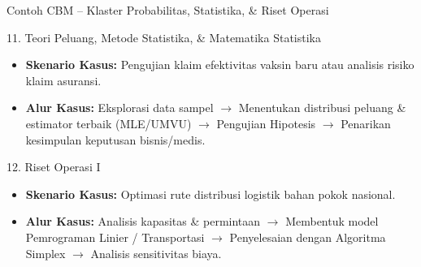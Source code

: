 \documentclass[aspectratio=169]{beamer} %
\begin{document}
\begin{frame}{Contoh CBM – Klaster Probabilitas, Statistika, \& Riset Operasi}
    \begin{block}{11. Teori Peluang, Metode Statistika, \& Matematika Statistika}
        \begin{itemize}
            \item \textbf{Skenario Kasus:} Pengujian klaim efektivitas vaksin baru atau analisis risiko klaim asuransi.
            \item \textbf{Alur Kasus:} Eksplorasi data sampel $\rightarrow$ Menentukan distribusi peluang \& estimator terbaik (MLE/UMVU) $\rightarrow$ Pengujian Hipotesis $\rightarrow$ Penarikan kesimpulan keputusan bisnis/medis.
        \end{itemize}
    \end{block}

    \begin{block}{12. Riset Operasi I}
        \begin{itemize}
            \item \textbf{Skenario Kasus:} Optimasi rute distribusi logistik bahan pokok nasional.
            \item \textbf{Alur Kasus:} Analisis kapasitas \& permintaan $\rightarrow$ Membentuk model Pemrograman Linier / Transportasi $\rightarrow$ Penyelesaian dengan Algoritma Simplex $\rightarrow$ Analisis sensitivitas biaya.
        \end{itemize}
    \end{block}
\end{frame}

\end{document}
